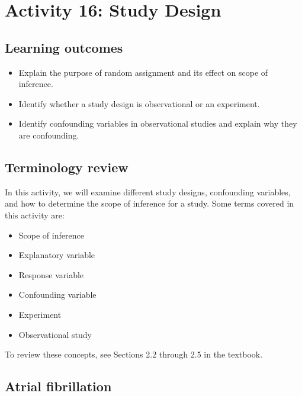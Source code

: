 \documentclass[
]{report}
\begin{document}
\vspace{0.5in}
\newpage

\section{Activity 16: Study Design}\label{activity-16-study-design}


\subsection{Learning outcomes}\label{learning-outcomes-6}

\begin{itemize}
\item
  Explain the purpose of random assignment and its effect on scope of inference.
\item
  Identify whether a study design is observational or an experiment.
\item
  Identify confounding variables in observational studies and explain why they are confounding.
\end{itemize}

\subsection{Terminology review}\label{terminology-review-5}

In this activity, we will examine different study designs, confounding variables, and how to determine the scope of inference for a study. Some terms covered in this activity are:

\begin{itemize}
\item
  Scope of inference
\item
  Explanatory variable
\item
  Response variable
\item
  Confounding variable
\item
  Experiment
\item
  Observational study
\end{itemize}

To review these concepts, see Sections 2.2 through 2.5 in the textbook.

\subsection{Atrial fibrillation}\label{atrial-fibrillation}
\end{document}
